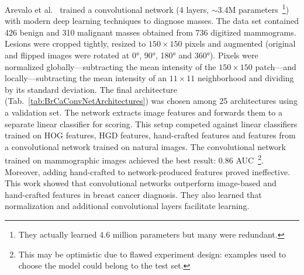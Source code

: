 \begin{comment}
- 50%
- Probable to overfit to the validation set.
- they select a model using the validation set and then join eveyrhting otgether an dmake a different division for 5 runs. This is not  a good practice, examples used to choose hyperparamteres and architecture will also appear in the new test sets so results will be better.
- combination of both 17 hand-crafted features plus convnet features (before Linear SVM) did not produce significant improvements.
\end{comment}
Arevalo et al.~\cite{Arevalo2016} trained a convolutional network (4 layers, $\sim$3.4M parameters~\footnote{They actually learned 4.6 million parameters but many were redundant.}) with modern deep learning techniques to diagnose masses. The data set contained 426 benign and 310 malignant masses obtained from 736 digitized mammograms. Lesions were cropped tightly, resized to $150\times150$ pixels and augmented (original and flipped images were rotated at 0°, 90°, 180° and 360°). 
Pixels were normalized globally---subtracting the mean intensity of the $150\times150$ patch---and locally---subtracting the mean intensity of an $11\times11$ neighborhood and dividing by its standard deviation.
The final architecture (Tab.~\ref{tab:BrCaConvNetArchitectures}) was chosen among 25 architectures using a validation set.
The network extracts image features and forwards them to a separate linear classifier for scoring.
This setup competed against linear classifiers trained on HOG features, HGD features, hand-crafted features and features from a convolutional network trained on natural images. The convolutional network trained on mammographic images achieved the best result: 0.86 AUC~\footnote{This may be optimistic due to flawed experiment design: examples used to choose the model could belong to the test set.}.
Moreover, adding hand-crafted to network-produced features proved ineffective.
This work showed that convolutional networks outperform image-based and hand-crafted features in breast cancer diagnosis. They also learned that normalization and additional convolutional layers facilitate learning.

